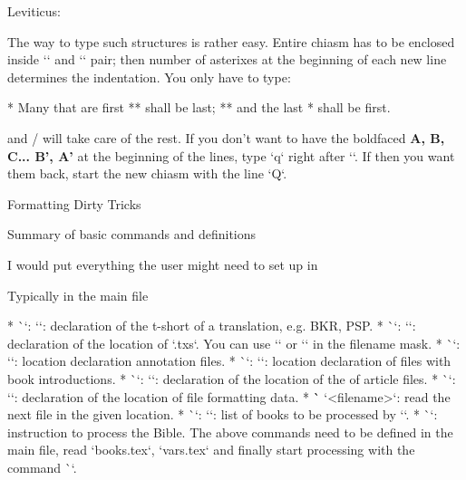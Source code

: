 {{{{\medskip
Leviticus:



The way to type such structures is rather easy.
Entire chiasm has to be enclosed inside `\begChiasm` and `\endChiasm` pair; then number of asterixes at the beginning of each new line determines the indentation.
You only have to type:

\medskip
\begtt
\begChiasm 
* Many that are first
** shall be last;
** and the last
* shall be first.
\endChiasm
\medskip
\endtt

and \OpBible/ will take care of the rest. If you don't want to have the boldfaced {\bf A, B, C... B', A'} at the beginning of the lines, type `\style q` right after `\begChiasm`. If then you want them back, start the new chiasm with the line  `\begChiasm \style Q`. 


\secc Formatting Dirty Tricks










%
\sec[sum] Summary of basic commands and definitions

I would put everything the user might need to set up in %

\secc Typically in the main file

\begitems
* \`\tmark`: `\def\tmark{<t-short>}`: declaration of the t-short of a translation, e.g. BKR, PSP.
* \`\txsfile`: `\def\txsfile {<filename mask>}`: declaration of the location of `.txs`. 
  You can use `\amark` or `\bmark` in the filename mask. 
* \`\notesfile`: `\def\notesfile {<filename mask>}`: location declaration
   annotation files. 
* \`\introfile`: `\def\introfile {<filename mask>}`: location declaration
   of files with book introductions. 
* \`\articlefile`: `\def\articlefile {<filename mask>}`: declaration of the location of the
   of article files.
* \`\fmtfile`: `\def\fmtfile {<filename mask>}`: declaration of the location of
   file formatting data. 
* \`` `{<filename>}`: read the next file in the given location.
* \`\printedbooks`: `\def\printedbooks {<list of a-bookmarks>}`:
  list of books to be processed by `\processbooks`.
* \`\processbooks`: instruction to process the Bible.
\enditems
The above commands need to be defined in the main file, 
read `books.tex`, `vars.tex` and finally start processing with the command
\`\processboks`.

}}}}
